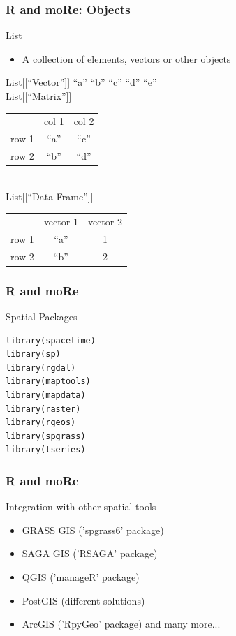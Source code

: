 \documentclass{beamer}
\begin{document}
\begin{frame}
\frametitle{R and moRe: Objects}
\begin{block}{List}
\begin{itemize}
\item A collection of elements, vectors or other objects
\end{itemize}
List[[``Vector'']] \alert{``a'' ``b'' ``c'' ``d'' ``e''}\\
List[[``Matrix'']]\\
\begin{tabular} {c c c}
 & \alert{col 1} & \alert{col 2}\\
\alert{row 1} & \alert{``a''} & \alert{``c''}\\
\alert{row 2} & \alert{``b''} & \alert{``d''}\\
\end{tabular}\\
List[[``Data Frame'']]\\
\begin{tabular} {c c c}
 & \alert{vector 1} & \alert{vector 2}\\
\alert{row 1} & \alert{``a''} & \alert{1}\\
\alert{row 2} & \alert{``b''} & \alert{2}\\
\end{tabular}
\end{block}
\end{frame}


\begin{frame}[fragile]
\frametitle{R and moRe}
\begin{exampleblock}{Spatial Packages}
\begin{verbatim}
library(spacetime)
library(sp)
library(rgdal)
library(maptools)
library(mapdata)
library(raster)
library(rgeos)
library(spgrass)
library(tseries)
\end{verbatim}
\end{exampleblock}
\end{frame}


\begin{frame}
\frametitle{R and moRe}
\begin{block}{Integration with other spatial tools}
\begin{itemize}
\item GRASS GIS ('spgrass6' package)
\item SAGA GIS ('RSAGA' package)
\item QGIS ('manageR' package)
\item PostGIS (different solutions)
\item ArcGIS ('RpyGeo' package)
and many more...
\end{itemize}
\end{block}
\end{frame}
\end{document}
